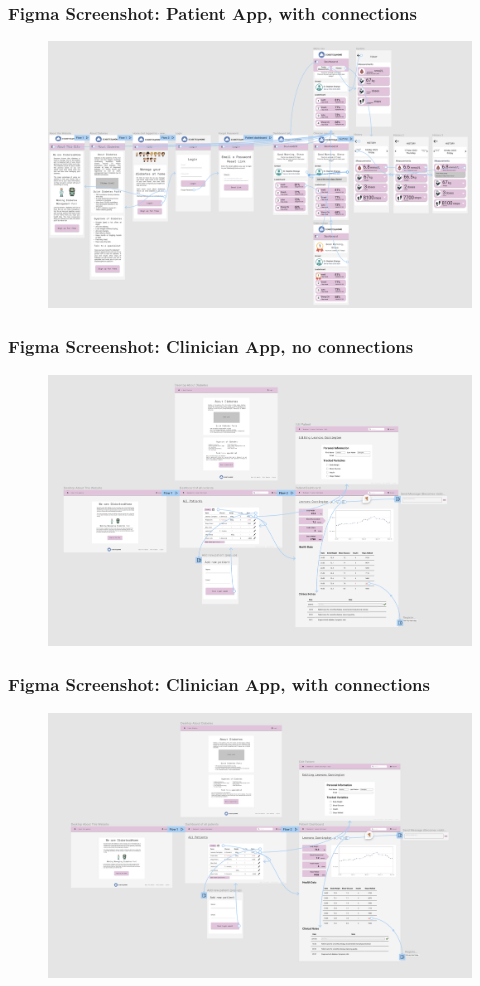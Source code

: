 \documentclass[12pt]{article}
\begin{document}
\subsubsection*{Figma Screenshot: Patient App, with connections}
\begin{figure}[H]
	\centering
	\includegraphics[width=.8\textwidth]{patient_lines}
\end{figure}\newpage
\subsubsection*{Figma Screenshot: Clinician App, no connections}
\begin{figure}[H]
	\centering
	\includegraphics[width=.8\textwidth]{desktop_nolines}
\end{figure}
\subsubsection*{Figma Screenshot: Clinician App, with connections}
\begin{figure}[H]
	\centering
	\includegraphics[width=.8\textwidth]{desktop_lines}
\end{figure}
\end{document}
